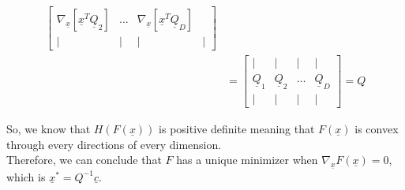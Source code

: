 \documentclass[11pt,letterpaper]{article}
\begin{document}
\begin{tcolorbox}
\begin{flushleft}
\begin{enumerate}
\begin{flushleft}
\begin{align*}
\begin{bmatrix}
                         \nabla_{\underline x}[\underline x^T \underline Q_2] & 
                         \dots & 
                         \nabla_{\underline x}[\underline x^T \underline Q_D] \\
                         | & | & | & |
                    \end{bmatrix}\\
                &=\begin{bmatrix}
                         | & | & | & | \\
                         \underline Q_1 & 
                         \underline Q_2 & 
                         \dots & 
                         \underline Q_D \\
                         | & | & | & |
                    \end{bmatrix} = Q
            \end{align*}
        \end{flushleft}
    \end{enumerate}
\end{flushleft}
\end{tcolorbox}


\begin{tcolorbox}
    \begin{flushleft}
    \justifying
        So, we know that $H(F(\underline x))$ is positive definite meaning that $F(\underline x)$ is convex through every directions of every dimension. \\
        Therefore, we can conclude that $F$ has a unique minimizer when $\nabla_{\underline x}F(\underline x) = 0$, which is 
        $\underline x^* = Q^{-1} \underline c$.
    \end{flushleft}
\end{tcolorbox}
\end{document}
